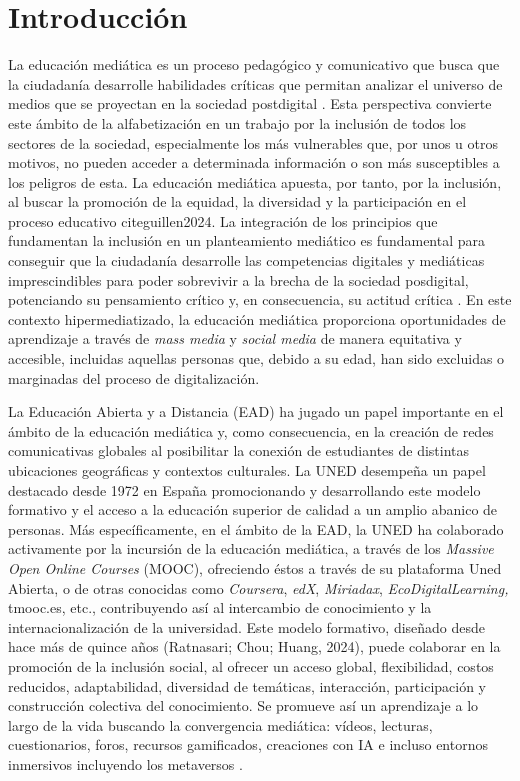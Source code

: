 
\section{Introducción}\label{sec-introducción}

La educación mediática es un proceso pedagógico y comunicativo que busca
que la ciudadanía desarrolle habilidades críticas que permitan analizar
el universo de medios que se proyectan en la sociedad postdigital
\cite{Escaño_2023}. Esta perspectiva convierte este ámbito de la
alfabetización en un trabajo por la inclusión de todos los sectores de
la sociedad, especialmente los más vulnerables que, por unos u otros
motivos, no pueden acceder a determinada información o son más
susceptibles a los peligros de esta. La educación mediática apuesta, por
tanto, por la inclusión, al buscar la promoción de la equidad, la
diversidad y la participación en el proceso educativo cite{guillen2024}. La integración de los principios que
fundamentan la inclusión en un planteamiento mediático es fundamental
para conseguir que la ciudadanía desarrolle las competencias digitales y
mediáticas imprescindibles para poder sobrevivir a la brecha de la
sociedad posdigital, potenciando su pensamiento crítico y, en
consecuencia, su actitud crítica \cite{palacios-rodríguez2025}. En este contexto hipermediatizado, la educación mediática
proporciona oportunidades de aprendizaje a través de \emph{mass media} y
\emph{social media} de manera equitativa y accesible, incluidas aquellas
personas que, debido a su edad, han sido excluidas o marginadas del
proceso de digitalización.

La Educación Abierta y a Distancia (EAD) ha jugado un papel importante
en el ámbito de la educación mediática y, como consecuencia, en la
creación de redes comunicativas globales al posibilitar la conexión de
estudiantes de distintas ubicaciones geográficas y contextos culturales.
La UNED desempeña un papel destacado desde 1972 en España promocionando
y desarrollando este modelo formativo y el acceso a la educación
superior de calidad a un amplio abanico de personas. Más
específicamente, en el ámbito de la EAD, la UNED ha colaborado
activamente por la incursión de la educación mediática, a través de los
\emph{Massive Open Online Courses} (MOOC), ofreciendo éstos a través de
su plataforma Uned Abierta, o de otras conocidas como \emph{Coursera},
\emph{edX}, \emph{Miriadax}, \emph{EcoDigitalLearning,} tmooc.es, etc.,
contribuyendo así al intercambio de conocimiento y la
internacionalización de la universidad. Este modelo formativo, diseñado
desde hace más de quince años (Ratnasari; Chou; Huang, 2024), puede
colaborar en la promoción de la inclusión social, al ofrecer un acceso
global, flexibilidad, costos reducidos, adaptabilidad, diversidad de
temáticas, interacción, participación y construcción colectiva del
conocimiento. Se promueve así un aprendizaje a lo largo de la vida
buscando la convergencia mediática: vídeos, lecturas, cuestionarios,
foros, recursos gamificados, creaciones con IA \cite{Aparicio-Gómez2024,cárdeasbenavides2024} e incluso
entornos inmersivos incluyendo los metaversos \cite{huesoromero2024,chuchuca2024metaverso}.

